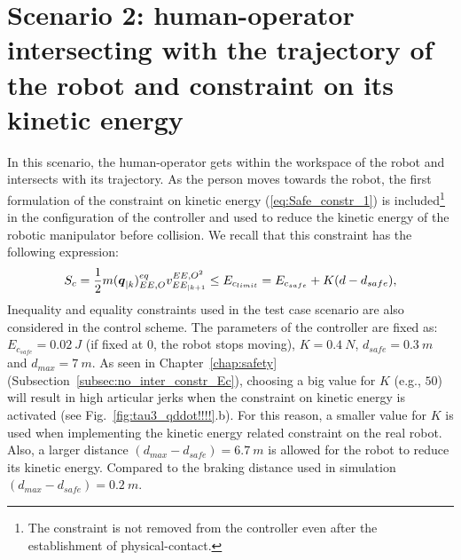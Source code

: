 \section[Human-robot interaction, scenario 2]{Scenario 2: human-operator intersecting with the trajectory of the robot and constraint on its kinetic energy}
In this scenario, the human-operator gets within the workspace of the robot and intersects with its trajectory. As the person moves towards the robot, the first formulation of the constraint on kinetic energy (\ref{eq:Safe_constr_1}) is included\footnote{The constraint is not removed from the controller even after the establishment of physical-contact.} in the configuration of the controller and used to reduce the kinetic energy of the robotic manipulator before collision. We recall that this constraint has the following expression:
\begin{equation} 
S_c =  \frac{1}{2} m(\mbox{\boldmath${q}$}_{|k})_{EE,O}^{eq} v_{EE_{|k+1}}^{{EE,O}^2} \leq E_{c_{limit}} = E_{c_{safe}} +  K (d - d_{safe}),
\label{eq:Safe_constr_11}
\end{equation}
Inequality and equality constraints used in the test case scenario are also considered in the control scheme. The parameters of the controller are fixed as: $E_{c_{safe}} = 0.02~J$ (if fixed at $0$, the robot stops moving), $K = 0.4~N$, $d_{safe} = 0.3~m$ and $d_{max} = 7~m$. As seen in Chapter~\ref{chap:safety} (Subsection~\ref{subsec:no_inter_constr_Ec}), choosing a big value for $K$ (e.g., $50$) will result in high articular jerks when the constraint on kinetic energy is activated (see Fig.~\ref{fig:tau3_qddot!!!!}.b). For this reason, a smaller value for $K$ is used when implementing the kinetic energy related constraint on the real robot. Also, a larger distance $(d_{max}-d_{safe}) = 6.7~m$ is allowed for the robot to reduce its kinetic energy. Compared to the braking distance used in simulation $(d_{max}-d_{safe}) = 0.2~m$.

